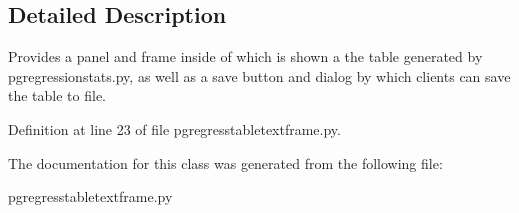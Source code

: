 \subsection{Detailed Description}
\begin{DoxyVerb}Provides a panel and frame inside of which
is shown a the table generated by pgregressionstats.py,
as well as a save button and dialog by which clients
can save the table to file.
\end{DoxyVerb}
 

Definition at line 23 of file pgregresstabletextframe.\+py.



The documentation for this class was generated from the following file\+:\begin{DoxyCompactItemize}
\item 
pgregresstabletextframe.\+py\end{DoxyCompactItemize}

